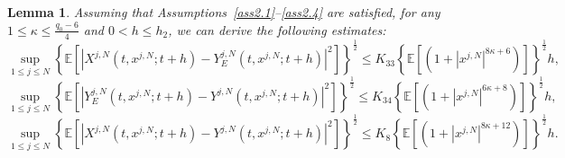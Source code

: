 \documentclass[12pt]{article}
\numberwithin{equation}{section}
\newtheorem{lemma}[assumption]{Lemma}
\begin{document}
\begin{lemma}\label{lemma5.7}
Assuming that Assumptions~\ref{ass2.1}--\ref{ass2.4} are satisfied, for any $1\leq \kappa \leq \tfrac{q_0-6}{4}$ and $0<h \leq h_2$, we can derive the following estimates:
\begin{equation}\tag{5.102}\label{5.75}
    \underset{1\leqslant j\leqslant N}{\sup} \left\{\mathbb{E}\left[\left|X^{j,N}\left(t, x^{j,N} ; t+h\right)-Y^{j,N}_E\left(t, x^{j,N} ; t+h\right)\right|^{2}\right]\right\}^{\frac{1}{2}} \leq K_{33}\left\{\mathbb{E}\left[\left(1+\left|x^{j,N}\right|^{8\kappa+6}\right)\right]\right\}^{\frac{1}{2}} h,
    \end{equation}
    \begin{equation}\tag{5.103}\label{5.76}
    \underset{1\leqslant j\leqslant N}{\sup} \left\{\mathbb{E}\left[\left|Y^{j,N}_E\left(t, x^{j,N} ; t+h\right)-Y^{j,N}\left(t, x^{j,N} ; t+h\right)\right|^{2}\right]\right\}^{\frac{1}{2}} \leq K_{34}\left\{\mathbb{E}\left[\left(1+\left|x^{j,N}\right|^{6\kappa+8}\right)\right]\right\}^{\frac{1}{2}} h, 
    \end{equation}
    \begin{equation}\tag{5.104}\label{5.77}
    \underset{1\leqslant j\leqslant N}{\sup} \left\{\mathbb{E}\left[\left|X^{j,N}\left(t, x^{j,N} ; t+h\right)-Y^{j,N}\left(t, x^{j,N} ; t+h\right)\right|^{2}\right]\right\}^{\frac{1}{2}} \leq K_{8}\left\{\mathbb{E}\left[\left(1+\left|x^{j,N}\right|^{8\kappa+12 }\right)\right]\right\}^{\frac{1}{2}} h.
    \end{equation}
\end{lemma} 
\end{document}
